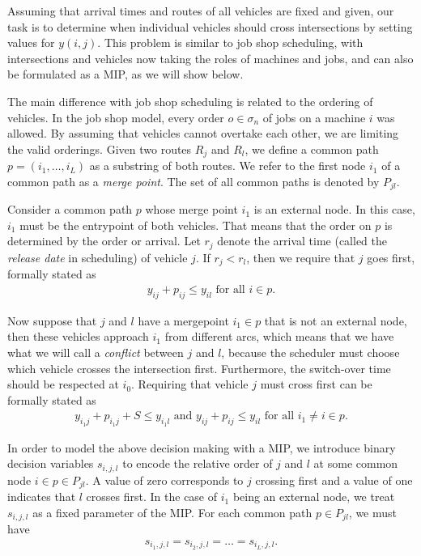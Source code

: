 \documentclass{article}
\theoremstyle{definition}
\theoremstyle{plain}
\begin{document}
Assuming that arrival times and routes of all vehicles are fixed and given, our
task is to determine when individual vehicles should cross intersections by
setting values for $y(i,j)$. This problem is similar to job shop scheduling,
with intersections and vehicles now taking the roles of machines and jobs, and
can also be formulated as a MIP, as we will show below.

The main difference with job shop scheduling is related to the ordering of
vehicles. In the job shop model, every order $o \in \sigma_{n}$ of jobs on a
machine $i$ was allowed. By assuming that vehicles cannot overtake each other,
we are limiting the valid orderings.
Given two routes $R_{j}$ and $R_{l}$, we define a common path
$p=(i_{1},\dots,i_{L})$ as a substring of both routes. We refer to the first
node $i_{1}$ of a common path as a \textit{merge point}. The set of all common
paths is denoted by $P_{jl}$.

Consider a common path $p$ whose merge point $i_{1}$ is an external node.
In this case, $i_{1}$ must be the entrypoint of both vehicles.
That means that the order on $p$ is determined by the order or arrival.
Let $r_{j}$ denote the arrival time (called the \textit{release date} in
scheduling) of vehicle $j$.
If $r_{j} < r_{l}$, then we require that $j$ goes first, formally stated as
\begin{align*}
  y_{ij} + p_{ij} \leq y_{il} \text{ for all } i \in p.
\end{align*}

Now suppose that $j$ and $l$ have a mergepoint $i_{1} \in p$ that is not an
external node, then these vehicles approach $i_{1}$ from different arcs,
which means that we have what we will call a \textit{conflict} between $j$ and
$l$, because the scheduler must choose which vehicle crosses the intersection
first. Furthermore, the switch-over time should be respected at $i_{0}$.
Requiring that vehicle $j$ must cross first can be formally stated as
\begin{align*}
  y_{i_{1}j} + p_{i_{1}j} + S \leq y_{i_{1}l} \text{ and } y_{ij} + p_{ij} \leq y_{il} \text{ for all } i_{1} \neq i \in p .
\end{align*}

In order to model the above decision making with a MIP, we introduce binary
decision variables $s_{i,j,l}$ to encode the relative order of $j$ and $l$ at some common
node $i \in p \in P_{jl}$. A value of zero corresponds to $j$ crossing first and
a value of one indicates that $l$ crosses first.
In the case of $i_{1}$ being an external node, we treat $s_{i,j,l}$ as a fixed
parameter of the MIP.
For each common path $p \in P_{jl}$, we must have
\begin{align*}
s_{i_{1},j,l} = s_{i_{2},j,l} = \dots = s_{i_{L},j,l}.
\end{align*}
\end{document}

